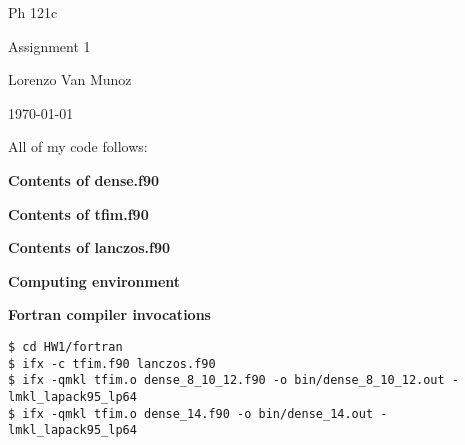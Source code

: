 \documentclass{article}
\begin{document}
{\centering

Ph 121c

Assignment 1

Lorenzo Van Munoz

\today

}

\newpage


All of my code follows:

\newpage

{\bf \noindent
Contents of dense.f90
}



\newpage

{\bf \noindent
Contents of tfim.f90
}



\newpage

{\bf \noindent
Contents of lanczos.f90
}



\newpage

{\bf \noindent
Computing environment
}




{\bf \noindent
Fortran compiler invocations
}

\begin{lstlisting}
$ cd HW1/fortran
$ ifx -c tfim.f90 lanczos.f90
$ ifx -qmkl tfim.o dense_8_10_12.f90 -o bin/dense_8_10_12.out -lmkl_lapack95_lp64
$ ifx -qmkl tfim.o dense_14.f90 -o bin/dense_14.out -lmkl_lapack95_lp64
\end{lstlisting}
\end{document}
